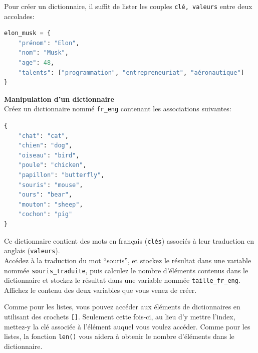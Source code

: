 	Pour créer un dictionnaire, il suffit de lister les couples \lstinline{clé, valeurs} entre
    deux accolades: \\
	
	 \begin{lstlisting}[language=Python]
elon_musk = {
    "prénom": "Elon",
    "nom": "Musk",
    "age": 48,
    "talents": ["programmation", "entrepreneuriat", "aéronautique"]
}   
        \end{lstlisting}
				
	\begin{Exercice}[5 minutes] [Python] \textbf{Manipulation d'un dictionnaire}\\
       Créez un dictionnaire nommé \lstinline{fr_eng} contenant les associations suivantes:
       
       \begin{lstlisting}[language=Python]
{
    "chat": "cat", 
    "chien": "dog", 
    "oiseau": "bird", 
    "poule": "chicken", 
    "papillon": "butterfly", 
    "souris": "mouse", 
    "ours": "bear", 
    "mouton": "sheep", 
    "cochon": "pig"
}
\end{lstlisting}

       Ce dictionnaire contient des mots en français (\lstinline{clés}) associés à leur traduction en anglais (\lstinline{valeurs}). \\
       
       Accédez à la traduction du mot ``souris'', et stockez le résultat dans une variable nommée \lstinline{souris_traduite}, puis calculez le nombre d'éléments contenus dans le dictionnaire et stockez le résultat dans une variable nommée \lstinline{taille_fr_eng}. Affichez le contenu des deux variables que vous venez de créer.
    
        \begin{conseil}
            Comme pour les listes, vous pouvez accéder aux éléments de dictionnaires en utilisant des crochets \lstinline{[]}. Seulement cette fois-ci, au lieu d'y mettre l'index, mettez-y la clé associée à l'élément auquel vous voulez accéder. Comme pour les listes, la fonction \lstinline{len()} vous aidera à obtenir le nombre d'éléments dans le dictionnaire.
        \end{conseil}
        
        \begin{solution}
            
        \end{solution}
    \end{Exercice}
    

